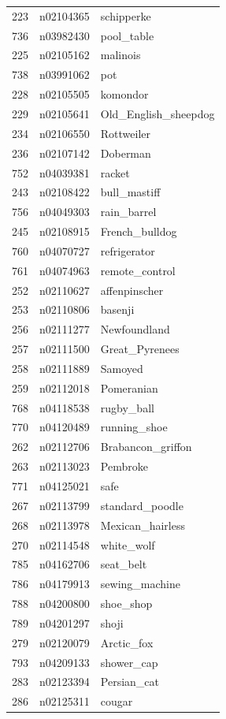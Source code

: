 \begin{table}
\begin{tabular}{cll}
223 & n02104365 & schipperke \\
736 & n03982430 & pool_table \\
225 & n02105162 & malinois \\
738 & n03991062 & pot \\
228 & n02105505 & komondor \\
229 & n02105641 & Old_English_sheepdog \\
234 & n02106550 & Rottweiler \\
236 & n02107142 & Doberman \\
752 & n04039381 & racket \\
243 & n02108422 & bull_mastiff \\
756 & n04049303 & rain_barrel \\
245 & n02108915 & French_bulldog \\
760 & n04070727 & refrigerator \\
761 & n04074963 & remote_control \\
252 & n02110627 & affenpinscher \\
253 & n02110806 & basenji \\
256 & n02111277 & Newfoundland \\
257 & n02111500 & Great_Pyrenees \\
258 & n02111889 & Samoyed \\
259 & n02112018 & Pomeranian \\
768 & n04118538 & rugby_ball \\
770 & n04120489 & running_shoe \\
262 & n02112706 & Brabancon_griffon \\
263 & n02113023 & Pembroke \\
771 & n04125021 & safe \\
267 & n02113799 & standard_poodle \\
268 & n02113978 & Mexican_hairless \\
270 & n02114548 & white_wolf \\
785 & n04162706 & seat_belt \\
786 & n04179913 & sewing_machine \\
788 & n04200800 & shoe_shop \\
789 & n04201297 & shoji \\
279 & n02120079 & Arctic_fox \\
793 & n04209133 & shower_cap \\
283 & n02123394 & Persian_cat \\
286 & n02125311 & cougar \\

\end{tabular}
\end{table}
